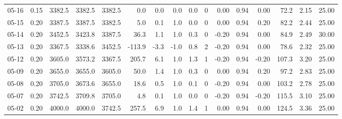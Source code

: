 \begin{threeparttable}
{\begin{tabular}{lrrrrrrrrrrrrrrr}
  05-16 &     0.15 & 3382.5 & 3382.5 & 3382.5 &        0.0 &            0.0 &                      0.0 &                 0.0 &              0 &       0.00 &      0.94 &           0.00 &             72.2 &            2.15 &                  25.00 \\
  05-15 &     0.20 & 3387.5 & 3387.5 & 3382.5 &        5.0 &            0.1 &                      1.0 &                 0.0 &              0 &       0.00 &      0.94 &           0.20 &             82.2 &            2.44 &                  25.00 \\
  05-14 &     0.20 & 3452.5 & 3423.8 & 3387.5 &       36.3 &            1.1 &                      1.0 &                 0.3 &              0 &      -0.20 &      0.94 &           0.00 &             84.9 &            2.49 &                  30.00 \\
  05-13 &     0.20 & 3367.5 & 3338.6 & 3452.5 &     -113.9 &           -3.3 &                     -1.0 &                 0.8 &              2 &      -0.20 &      0.94 &           0.00 &             78.6 &            2.32 &                  25.00 \\
  05-12 &     0.20 & 3605.0 & 3573.2 & 3367.5 &      205.7 &            6.1 &                      1.0 &                 1.3 &              1 &      -0.20 &      0.94 &          -0.20 &            107.3 &            3.20 &                  25.00 \\
  05-09 &     0.20 & 3655.0 & 3655.0 & 3605.0 &       50.0 &            1.4 &                      1.0 &                 0.3 &              0 &       0.00 &      0.94 &           0.20 &             97.2 &            2.83 &                  25.00 \\
  05-08 &     0.20 & 3705.0 & 3673.6 & 3655.0 &       18.6 &            0.5 &                      1.0 &                 0.1 &              0 &      -0.20 &      0.94 &           0.00 &            103.2 &            2.78 &                  25.00 \\
  05-07 &     0.20 & 3742.5 & 3709.8 & 3705.0 &        4.8 &            0.1 &                      1.0 &                 0.0 &              0 &      -0.20 &      0.94 &          -0.20 &            115.5 &            3.10 &                  25.00 \\
  05-02 &     0.20 & 4000.0 & 4000.0 & 3742.5 &      257.5 &            6.9 &                      1.0 &                 1.4 &              1 &       0.00 &      0.94 &           0.00 &            124.5 &            3.36 &                  25.00 \\

\end{tabular}}
\end{threeparttable}
